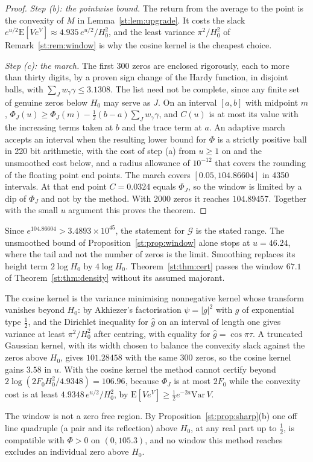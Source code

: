 \begin{proof}
\emph{Step (b): the pointwise bound.} The return from the average to the point is the convexity of $M$ in Lemma~\ref{st:lem:upgrade}. It costs the slack $e^{u/2}\mathrm E[Ve^V]\approx4.935\,e^{u/2}/H_0^2$, and the least variance $\pi^2/H_0^2$ of Remark~\ref{st:rem:window} is why the cosine kernel is the cheapest choice.

\emph{Step (c): the march.} The first 300 zeros are enclosed rigorously, each to more than thirty digits, by a proven sign change of the Hardy function, in disjoint balls, with $\sum_Jw_\gamma\gamma\le3.1308$. The list need not be complete, since any finite set of genuine zeros below $H_0$ may serve as $J$. On an interval $[a,b]$ with midpoint $m$, $\Phi_J(u)\ge\Phi_J(m)-\tfrac12(b-a)\sum_Jw_\gamma\gamma$, and $C(u)$ is at most its value with the increasing terms taken at $b$ and the trace term at $a$. An adaptive march accepts an interval when the resulting lower bound for $\Phi$ is a strictly positive ball in 220 bit arithmetic, with the cost of step (a) from $u\ge1$ on and the unsmoothed cost below, and a radius allowance of $10^{-12}$ that covers the rounding of the floating point end points. The march covers $[0.05,104.86604]$ in 4350 intervals. At that end point $C=0.0324$ equals $\Phi_J$, so the window is limited by a dip of $\Phi_J$ and not by the method. With 2000 zeros it reaches $104.89457$. Together with the small $u$ argument this proves the theorem.
\end{proof}
Since $e^{104.86604}>3.4893\times10^{45}$, the statement for $\mathcal G$ is the stated range. The unsmoothed bound of Proposition~\ref{st:prop:window} alone stops at $u=46.24$, where the tail and not the number of zeros is the limit. Smoothing replaces its height term $2\log H_0$ by $4\log H_0$. Theorem~\ref{st:thm:cert} passes the window $67.1$ of Theorem~\ref{st:thm:density} without its assumed majorant.
\begin{remark}\label{st:rem:window}
The cosine kernel is the variance minimising nonnegative kernel whose transform vanishes beyond $H_0$: by Akhiezer's factorisation $\psi=|g|^2$ with $g$ of exponential type $\tfrac12$, and the Dirichlet inequality for $\hat g$ on an interval of length one gives variance at least $\pi^2/H_0^2$ after centring, with equality for $\hat g=\cos\pi\tau$. A truncated Gaussian kernel, with its width chosen to balance the convexity slack against the zeros above $H_0$, gives $101.28458$ with the same 300 zeros, so the cosine kernel gains $3.58$ in $u$. With the cosine kernel the method cannot certify beyond $2\log(2F_0H_0^2/4.9348)=106.96$, because $\Phi_J$ is at most $2F_0$ while the convexity cost is at least $4.9348\,e^{u/2}/H_0^2$, by $\mathrm E[Ve^V]\ge\tfrac12e^{-2a}\mathrm{Var}\,V$.

The window is not a zero free region. By Proposition~\ref{st:prop:sharp}(b) one off line quadruple (a pair and its reflection) above $H_0$, at any real part up to $\tfrac12$, is compatible with $\Phi>0$ on $(0,105.3)$, and no window this method reaches excludes an individual zero above $H_0$.\end{remark}

